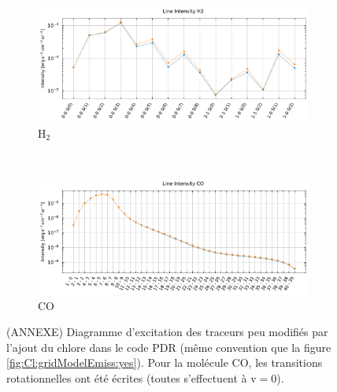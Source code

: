 \begin{figure}[!h]
    \begin{subfigure}[t]{0.49\textwidth} %
        \centering \includegraphics[trim = {0 0 0 1cm},clip,width=1\textwidth]{figure/Cl/gridModelEmiss/I_comp_H2.pdf}
        \caption{$\mathrm{H}_2$}
    \end{subfigure}
    ~ 
    \begin{subfigure}[t]{0.49\textwidth} %
        \centering \includegraphics[trim = {0 0 0 1cm},clip,width=1\textwidth]{figure/Cl/gridModelEmiss/I_comp_CO.pdf}
        \caption{$\mathrm{CO}$}
    \end{subfigure}
    
    \caption{(ANNEXE) Diagramme d'excitation des traceurs peu modifiés par l'ajout du chlore dans le code PDR (même convention que la figure \ref{fig:Cl:gridModelEmiss:yes}). Pour la molécule $\mathrm{CO}$, les transitions rotationnelles ont été écrites (toutes s'effectuent à $\mathrm{v}=0$).}
    \label{fig:Cl:gridModelEmiss:no}
\end{figure}



